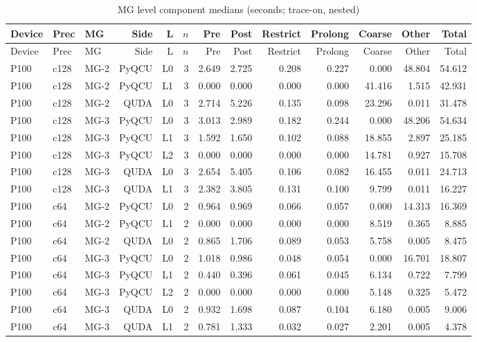 \begin{longtable}{@{}lllrrrrrrrrrr@{}}
\caption{MG level component medians (seconds; trace-on, nested)}\label{tab:stage-components}\\
\toprule
Device & Prec & MG & Side & L & $n$ & Pre & Post & Restrict & Prolong & Coarse & Other & Total \\
\midrule
\endfirsthead
\toprule
Device & Prec & MG & Side & L & $n$ & Pre & Post & Restrict & Prolong & Coarse & Other & Total \\
\midrule
\endhead
P100 & c128 & MG-2 & PyQCU & L0 & 3 & 2.649 & 2.725 & 0.208 & 0.227 & 0.000 & 48.804 & 54.612 \\
P100 & c128 & MG-2 & PyQCU & L1 & 3 & 0.000 & 0.000 & 0.000 & 0.000 & 41.416 & 1.515 & 42.931 \\
P100 & c128 & MG-2 & QUDA & L0 & 3 & 2.714 & 5.226 & 0.135 & 0.098 & 23.296 & 0.011 & 31.478 \\
P100 & c128 & MG-3 & PyQCU & L0 & 3 & 3.013 & 2.989 & 0.182 & 0.244 & 0.000 & 48.206 & 54.634 \\
P100 & c128 & MG-3 & PyQCU & L1 & 3 & 1.592 & 1.650 & 0.102 & 0.088 & 18.855 & 2.897 & 25.185 \\
P100 & c128 & MG-3 & PyQCU & L2 & 3 & 0.000 & 0.000 & 0.000 & 0.000 & 14.781 & 0.927 & 15.708 \\
P100 & c128 & MG-3 & QUDA & L0 & 3 & 2.654 & 5.405 & 0.106 & 0.082 & 16.455 & 0.011 & 24.713 \\
P100 & c128 & MG-3 & QUDA & L1 & 3 & 2.382 & 3.805 & 0.131 & 0.100 & 9.799 & 0.011 & 16.227 \\
P100 & c64 & MG-2 & PyQCU & L0 & 2 & 0.964 & 0.969 & 0.066 & 0.057 & 0.000 & 14.313 & 16.369 \\
P100 & c64 & MG-2 & PyQCU & L1 & 2 & 0.000 & 0.000 & 0.000 & 0.000 & 8.519 & 0.365 & 8.885 \\
P100 & c64 & MG-2 & QUDA & L0 & 2 & 0.865 & 1.706 & 0.089 & 0.053 & 5.758 & 0.005 & 8.475 \\
P100 & c64 & MG-3 & PyQCU & L0 & 2 & 1.018 & 0.986 & 0.048 & 0.054 & 0.000 & 16.701 & 18.807 \\
P100 & c64 & MG-3 & PyQCU & L1 & 2 & 0.440 & 0.396 & 0.061 & 0.045 & 6.134 & 0.722 & 7.799 \\
P100 & c64 & MG-3 & PyQCU & L2 & 2 & 0.000 & 0.000 & 0.000 & 0.000 & 5.148 & 0.325 & 5.472 \\
P100 & c64 & MG-3 & QUDA & L0 & 2 & 0.932 & 1.698 & 0.087 & 0.104 & 6.180 & 0.005 & 9.006 \\
P100 & c64 & MG-3 & QUDA & L1 & 2 & 0.781 & 1.333 & 0.032 & 0.027 & 2.201 & 0.005 & 4.378 \\

\end{longtable}
